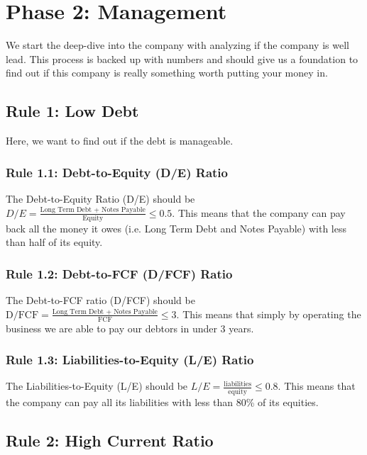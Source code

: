 \section{Phase 2: Management}

We start the deep-dive into the company with analyzing if the company is well lead.
This process is backed up with numbers and should give us a foundation to find out if
this company is really something worth putting your money in.

\subsection{Rule 1: Low Debt}

Here, we want to find out if the debt is manageable.

\subsubsection{{Rule 1.1: Debt-to-Equity (D/E) Ratio}}

The Debt-to-Equity Ratio (D/E) should be $D/E = \frac{\text{Long Term Debt + Notes Payable}}{\text{Equity}} \leq 0.5$.
This means that the company can pay back all the money it owes (i.e. Long Term Debt
and Notes Payable) with less than half of its equity.

\subsubsection{{Rule 1.2: Debt-to-FCF (D/FCF) Ratio}}

The Debt-to-FCF ratio (D/FCF) should be $\text{D/FCF} = \frac{\text{Long Term Debt + Notes Payable}}{\text{FCF}} \leq 3$.
This means that simply by operating the business we are able to pay our debtors
in under 3 years.

\subsubsection{{Rule 1.3: Liabilities-to-Equity (L/E) Ratio}}

The Liabilities-to-Equity (L/E) should be $L/E = \frac{\text{liabilities}}{\text{equity}} \leq 0.8$.
This means that the company can pay all its liabilities with less than 80\% of its
equities.

\subsection{Rule 2: High Current Ratio}

